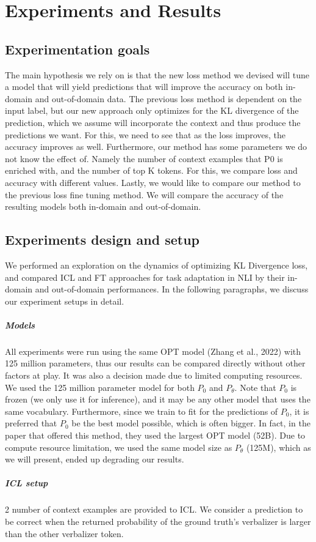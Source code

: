 \documentclass[10pt,twocolumn,letterpaper]{article}
\begin{document}
\section{Experiments and Results}


\subsection*{Experimentation goals}
The main hypothesis we rely on is that the new loss method we devised will tune a model that will yield predictions that will improve the accuracy on both in-domain and out-of-domain data. The previous loss method is dependent on the input label, but our new approach only optimizes for the KL divergence of the prediction, which we assume will incorporate the context and thus produce the predictions we want. For this, we need to see that as the loss improves, the accuracy improves as well. 
Furthermore, our method has some parameters we do not know the effect of. Namely the number of context examples that P0 is enriched with, and the number of top K tokens. For this, we compare loss and accuracy with different values.
Lastly, we would like to compare our method to the previous loss fine tuning method. We will compare the accuracy of the resulting models both in-domain and out-of-domain.

\subsection*{Experiments design and setup}
We performed an exploration on the dynamics of optimizing  KL Divergence loss, and compared ICL and FT approaches for task adaptation in NLI by their in-domain and out-of-domain performances. In the following paragraphs, we discuss our experiment setups in detail.

\subparagraph*{Models}
All experiments were run using the same OPT model (Zhang et al., 2022) with 125 million parameters, thus our results can be compared directly without other factors at play. It was also a decision made due to limited computing resources.
We used the 125 million parameter model for both $P_0$ and $P_\theta$. Note that $P_0$ is frozen (we only use it for inference),
 and it may be any other model that uses the same vocabulary. Furthermore, since we train to fit for the predictions of $P_0$,
  it is preferred that $P_0$ be the best model possible, which is often bigger.
   In fact, in the paper that offered this method, they used the largest OPT model (52B).
    Due to compute resource limitation, we used the same model size as $P_\theta$ (125M), which as we will present, ended up degrading our results.
\subparagraph*{ICL setup}
2 number of context examples are provided to ICL. We consider a prediction to be correct when the returned probability of the ground truth’s verbalizer is larger than the other verbalizer token.
\end{document}
